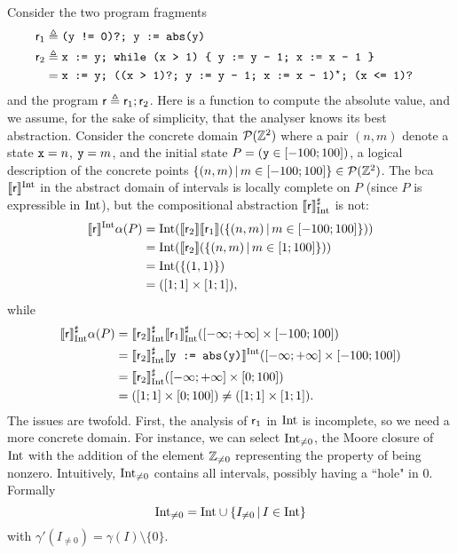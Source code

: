 \begin{example}\label{ex:lcla:refine-pre-usefulness}
	Consider the two program fragments
	\begin{align*}
		\mathsf{r}_1 &\triangleq \texttt{(y != 0)?; y := abs(y)} \\
		\mathsf{r}_2 &\triangleq \texttt{x := y; while (x > 1) \{ y := y - 1; x := x - 1 \}} \\
		&= \texttt{x := y; ((x > 1)?; y := y - 1; x := x - 1)$^{\star}$; (x <= 1)? }
	\end{align*}
	and the program $\mathsf{r} \triangleq \mathsf{r}_1; \mathsf{r}_2$. Here  is a function to compute the absolute value, and we assume, for the sake of simplicity, that the analyser knows its best abstraction. Consider the concrete domain $\mathcal{P}(\mathbb{Z}^2)$ where a pair $(n, m)$ denote a state $\texttt{x} = n$, $\texttt{y} = m$, and the initial state $P = (\texttt{y} \in [-100; 100])$, a logical description of the concrete points $\{ (n, m) \,\vert\, m \in [-100; 100] \} \in \mathcal{P}(\mathbb{Z}^2)$.
	The bca $\llbracket\mathsf{r}\rrbracket^{\text{Int}}$ in the abstract domain of intervals is locally complete on $P$ (since $P$ is expressible in $\text{Int}$), but the compositional abstraction $\llbracket\mathsf{r}\rrbracket^{\sharp}_{\text{Int}}$ is not:
	\begin{align*}
		\llbracket\mathsf{r}\rrbracket^{\text{Int}} \alpha(P) &= \text{Int} (\llbracket\mathsf{r}_2\rrbracket \llbracket\mathsf{r}_1\rrbracket (\{ (n, m) \,\vert\, m \in [-100; 100] \})) \\
		&= \text{Int} (\llbracket\mathsf{r}_2\rrbracket (\{ (n, m) \,\vert\, m \in [1; 100] \})) \\
		&= \text{Int} (\{ (1, 1) \}) \\
		&= ([1; 1] \times [1; 1]) ,
	\end{align*}
	while
	\begin{align*}
		\llbracket\mathsf{r}\rrbracket^{\sharp}_{\text{Int}} \alpha(P) &= \llbracket\mathsf{r}_2\rrbracket^{\sharp}_{\text{Int}} \llbracket\mathsf{r}_1\rrbracket^{\sharp}_{\text{Int}} ([-\infty; +\infty] \times [-100; 100]) \\
		&= \llbracket\mathsf{r}_2\rrbracket^{\sharp}_{\text{Int}} \llbracket\texttt{y := abs(y)}\rrbracket^{\text{Int}} ([-\infty; +\infty] \times [-100; 100]) \\
		&= \llbracket\mathsf{r}_2\rrbracket^{\sharp}_{\text{Int}} ([-\infty; +\infty] \times [0; 100]) \\
		&= ([1; 1] \times [0; 100]) \neq ([1; 1] \times [1; 1]) .
	\end{align*}
	The issues are twofold.
	First, the analysis of $\mathsf{r}_1$ in $\text{Int}$ is incomplete, so we need a more concrete domain. For instance, we can select $\text{Int}_{\neq 0}$, the Moore closure of $\text{Int}$ with the addition of the element $\mathbb{Z}_{\neq 0}$ representing the property of being nonzero. Intuitively, $\text{Int}_{\neq 0}$ contains all intervals, possibly having a ``hole" in $0$. Formally
	\[
	\text{Int}_{\neq 0} = \text{Int} \cup \{ I_{\neq 0} \,\vert\, I \in \text{Int} \}
	\]
	with $\gamma'(I_{\neq 0 }) = \gamma(I) \setminus \{ 0 \}$.
	

\end{example}
